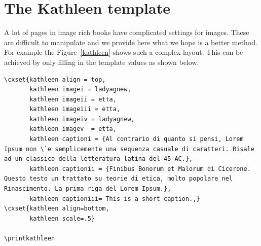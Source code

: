 




\begin{center}\printkathleen\par\label{kathleen}\end{center}

\newpage

\section{The Kathleen template} 

A lot of pages in image rich books have complicated settings for images.
These are difficult to manipulate and we provide here what we hope is
a better method. For example the Figure~\ref{kathleen} shows such a complex layout. This can be achieved by only filling in the template
values as shown below.

\begin{tcolorbox}
\begin{lstlisting}
\cxset{kathleen align = top,
       kathleen imagei = ladyagnew,
       kathleen imageii = etta,
       kathleen imageiii = etta,
       kathleen imageiv = ladyagnew,
       kathleen imagev  = etta,
       kathleen captioni = {Al contrario di quanto si pensi, Lorem Ipsum non \`e semplicemente una sequenza casuale di caratteri. Risale ad un classico della letteratura latina del 45 AC.}, 
       kathleen captionii = {Finibus Bonorum et Malorum di Cicerone. Questo testo un trattato su teorie di etica, molto popolare nel Rinascimento. La prima riga del Lorem Ipsum.},
       kathleen captioniii= This is a short caption.,} 
\cxset{kathleen align=bottom,
       kathleen scale=.5}

\printkathleen

\end{lstlisting}
\end{tcolorbox}


